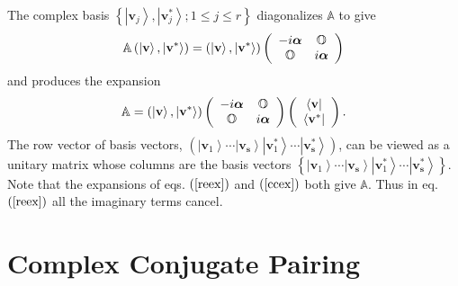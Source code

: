 \documentclass[preprint,aps,showkeys]{revtex4}%
\begin{document}
The complex basis $\left\{  \left\vert \mathbf{v}_{j}\right\rangle ,\left\vert
\mathbf{v}_{j}^{\ast}\right\rangle ;1\leq j\leq r\right\}  $ diagonalizes
$\mathbb{A}$ to give
\begin{equation}
\mathbb{A}\left(  \left\vert \mathbf{v}\right\rangle ,\left\vert
\mathbf{v}^{\ast}\right\rangle \right)  =\left(  \left\vert \mathbf{v}%
\right\rangle ,\left\vert \mathbf{v}^{\ast}\right\rangle \right)  \left(
\begin{array}
[c]{cc}%
-i\boldsymbol{\alpha} & \mathbb{O}\\
\mathbb{O} & i\boldsymbol{\alpha}
\end{array}
\right)
\end{equation}
and produces the expansion%
\begin{equation}
\mathbb{A}=\left(  \left\vert \mathbf{v}\right\rangle ,\left\vert
\mathbf{v}^{\ast}\right\rangle \right)  \left(
\begin{array}
[c]{cc}%
-i\boldsymbol{\alpha} & \mathbb{O}\\
\mathbb{O} & i\boldsymbol{\alpha}
\end{array}
\right)  \left(
\begin{array}
[c]{c}%
\left\langle \mathbf{v}\right\vert \\
\left\langle \mathbf{v}^{\ast}\right\vert
\end{array}
\right)  . \label{ccex}%
\end{equation}
The row vector of basis vectors, $\left(  \left\vert \mathbf{v}_{1}%
\right\rangle \cdots\left\vert \mathbf{v}_{\mathbf{s}}\right\rangle \left\vert
\mathbf{v}_{1}^{\ast}\right\rangle \cdots\left\vert \mathbf{v}_{\mathbf{s}%
}^{\ast}\right\rangle \right)  $, can be viewed as a unitary matrix whose
columns are the basis vectors $\left\{  \left\vert \mathbf{v}_{1}\right\rangle
\cdots\left\vert \mathbf{v}_{\mathbf{s}}\right\rangle \left\vert
\mathbf{v}_{1}^{\ast}\right\rangle \cdots\left\vert \mathbf{v}_{\mathbf{s}%
}^{\ast}\right\rangle \right\}  $. Note that the expansions of eqs. $\left(
\ref{reex}\right)  $ and $\left(  \ref{ccex}\right)  $ both give $\mathbb{A}.$
Thus in eq. $\left(  \ref{reex}\right)  $ all the imaginary terms cancel.

\section{Complex Conjugate Pairing\label{pairing}}
\end{document}
